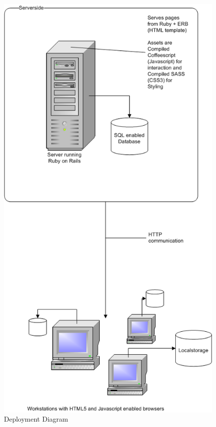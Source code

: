 \documentclass{report}
\begin{document}
				\begin{figure}[htb]
				\begin{center}
				\includegraphics[scale=0.50]{EAD.png}
				\caption{Deployment Diagram}
				\label{fig: EAD}
				\end{center}
				\end{figure}
				\newpage
									
\end{document}
